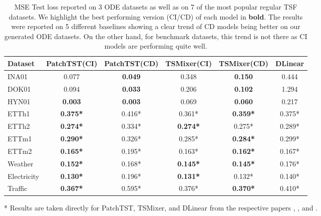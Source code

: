 \begin{table}[!h]
	\centering
	\scriptsize
	\begin{threeparttable}
		
		\caption{%
			MSE Test loss reported on 3 ODE datasets as well as on 7 of the most popular regular TSF datasets.
			We highlight the best performing version (CI/CD) of each model in \textbf{bold}.
			The results were reported on 5 different baselines showing a clear trend of CD models being better on our generated ODE datasets.
			On the other hand, for benchmark datasets, this trend is not there as CI models are performing quite well.
		}\label{tab:regular_time_series_forecasting_results}
		
		\begin{tabular}{l ccccc}
			\toprule
			Dataset & PatchTST(CI) & PatchTST(CD) & TSMixer(CI) & TSMixer(CD) & DLinear
			\\  \midrule
			INA01 & 0.077 & \textbf{0.049} & 0.348 & \textbf{0.150} & 0.444 \\ 
			DOK01 & 0.094 & \textbf{0.033} & 0.206 & \textbf{0.102} & 1.294 \\
			HYN01 & \textbf{0.003} & \textbf{0.003} & 0.069 & \textbf{0.060} & 0.217 \\
			\hline
			ETTh1 & \textbf{0.375*} & 0.416* & 0.361* & \textbf{0.359*} & 0.375* \\
			ETTh2 & \textbf{0.274*} & 0.334* & \textbf{0.274*} & 0.275* & 0.289* \\
			ETTm1 & \textbf{0.290*} & 0.326* & 0.285* & \textbf{0.284*} & 0.299* \\
			ETTm2 & \textbf{0.165*} & 0.195* & 0.163* & \textbf{0.162*} & 0.167* \\
			Weather & \textbf{0.152*} & 0.168* & \textbf{0.145*} & \textbf{0.145*} & 0.176* \\
			Electricity & \textbf{0.130*} & 0.196* & \textbf{0.131*} & 0.132* & 0.140* \\
			Traffic & \textbf{0.367*} & 0.595* & 0.376* & \textbf{0.370*} & 0.410* 
			\\  \bottomrule
		\end{tabular}
		\begin{tablenotes}
			\small
			\item[*] Results are taken directly for PatchTST, TSMixer, and DLinear from the respective papers \citep{Nie2023.Time}, \citep{Chen2023.TSMixerb}, and \citep{Zeng2023.Are}. 
		\end{tablenotes}
		
	\end{threeparttable}
\end{table}

